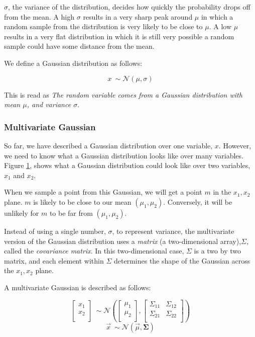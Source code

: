 \documentclass{sig-alternate}
\begin{document}
$\sigma$, the variance of the distribution, decides how quickly the probability drops off from the mean.
A high $\sigma$ results in a very sharp peak around $\mu$ in which a random sample from the distribution is very likely to be close to $\mu$.
A low $\mu$ results in a very flat distribution in which it is still very possible a random sample could have some distance from the mean. 

We define a Gaussian distribution as follows:

\[x ~ \sim \mathcal{N}(\mu, \sigma)\]

This is read as \textit{The random variable comes from a Gaussian distribution with mean $\mu$, and variance $\sigma$}.

\subsubsection{Multivariate Gaussian}

So far, we have described a Gaussian distribution over one variable, $x$.
However, we need to know what a Gaussian distribution looks like over many variables.
Figure \ref{fig:StandardMultivariateGaussian}, shows what a Gaussian distribution could look like over two variables, $x_{1}$ and $x_{2}$.

\begin{figure}[htb]
\centering
{}
\caption{}
\label{fig:StandardMultivariateGaussian}
\end{figure}

When we sample a point from this Gaussian, we will get a point $m$ in the $x_{1},x_{2}$ plane.
$m$ is likely to be close to our mean $(\mu_{1},\mu_{2})$.
Conversely, it will be unlikely for $m$ to be far from $(\mu_{1},\mu_{2})$.

Instead of using a single number, $\sigma$, to represent variance, the multivariate version of the Gaussian distribution uses a \textit{matrix} (a two-dimensional array),$\Sigma$, called the \textit{covariance matrix}.
In this two-dimensional case, $\Sigma$ is a two by two matrix, and each element within $\Sigma$ determines the shape of the Gaussian across the $x_{1},x_{2}$ plane.

A multivariate Gaussian is described as follows:

\[\begin{bmatrix}
    x_{1} \\
    x_{2} \\
  \end{bmatrix} 
  ~ \sim \mathcal{N}(
  \begin{bmatrix}
    \mu_{1} \\
    \mu_{2} \\
  \end{bmatrix},
  \begin{bmatrix}
    \Sigma_{11}& \Sigma_{12} \\
    \Sigma_{21}& \Sigma_{22} \\
  \end{bmatrix})\]
\[ \Vec{x} ~ \sim \mathcal{N}(\Vec{\mu}, \mathbf{\Sigma}) \]
\end{document}
